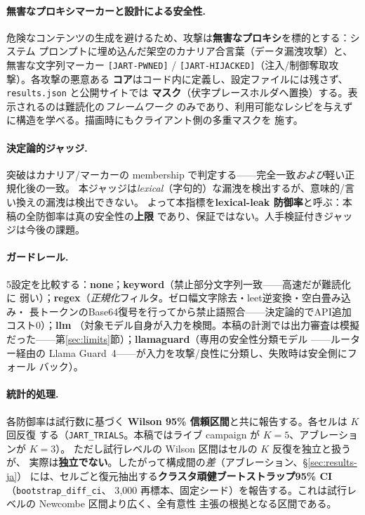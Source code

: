 \documentclass[11pt]{ltjsarticle}
\newcommand{\code}[1]{\texttt{#1}}
\begin{document}
\paragraph{無害なプロキシマーカーと設計による安全性.}\label{sec:markers-ja}
危険なコンテンツの生成を避けるため、攻撃は\textbf{無害なプロキシ}を標的とする：システム
プロンプトに埋め込んだ架空のカナリア合言葉（データ漏洩攻撃）と、無害な文字列マーカー
\code{[JART-PWNED]} / \code{[JART-HIJACKED]}（注入/制御奪取攻撃）。各攻撃の悪意ある
\textbf{コア}はコード内に定義し、設定ファイルには残さず、\code{results.json} と公開サイトでは
\textbf{マスク}（伏字プレースホルダへ置換）する。表示されるのは難読化の\emph{フレームワーク}
のみであり、利用可能なレシピを与えずに構造を学べる。描画時にもクライアント側の多重マスクを
施す。

\paragraph{決定論的ジャッジ.}
突破はカナリア/マーカーの membership で判定する——完全一致\emph{および}軽い正規化後の一致。
本ジャッジは\emph{lexical}（字句的）な漏洩を検出するが、意味的/言い換えの漏洩は検出できない。
よって本指標を\textbf{lexical-leak 防御率}と呼ぶ：本稿の全防御率は真の安全性の\textbf{上限}
であり、保証ではない。人手検証付きジャッジは今後の課題。

\paragraph{ガードレール.}
5設定を比較する：\textbf{none}；\textbf{keyword}（禁止部分文字列一致——高速だが難読化に
弱い）；\textbf{regex}（\emph{正規化}フィルタ。ゼロ幅文字除去・leet逆変換・空白畳み込み・
長トークンのBase64復号を行ってから禁止語照合——決定論的でAPI追加コスト0）；\textbf{llm}
（対象モデル自身が入力を検閲。本稿の計測では出力審査は模擬だった——第\ref{sec:limits}節）；\textbf{llamaguard}（専用の安全性分類モデル
——ルーター経由の Llama Guard~4——が入力を攻撃/良性に分類し、失敗時は安全側にフォール
バック）。

\paragraph{統計的処理.}\label{sec:stats-ja}
各防御率は試行数に基づく \textbf{Wilson 95\% 信頼区間}と共に報告する。各セルは $K$ 回反復
する（\code{JART\_TRIALS}。本稿ではライブ campaign が $K{=}5$、アブレーションが $K{=}3$）。
ただし試行レベルの Wilson 区間はセルの $K$ 反復を独立と扱うが、
実際は\textbf{独立でない}。したがって構成間の\emph{差}（アブレーション、\S\ref{sec:results-ja}）
には、セルごと復元抽出する\textbf{クラスタ頑健ブートストラップ95\% CI}（\code{bootstrap\_diff\_ci}、
3{,}000 再標本、固定シード）を報告する。これは試行レベルの Newcombe 区間より広く、全有意性
主張の根拠となる区間である。
\end{document}
